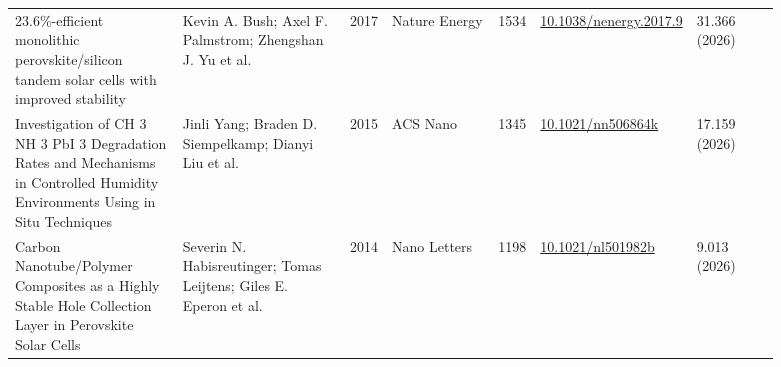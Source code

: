 \documentclass[10pt,a4paper]{article}
\begin{document}
{\begin{longtable}{p{0.220\linewidth}p{0.220\linewidth}p{0.044\linewidth}p{0.148\linewidth}p{0.044\linewidth}p{0.107\linewidth}p{0.110\linewidth}}
23.6\%-efficient monolithic perovskite/silicon tandem solar cells with improved stability & Kevin A. Bush; Axel F. Palmstrom; Zhengshan J. Yu et al. & 2017 & Nature Energy & 1534 & \href{https://doi.org/10.1038/nenergy.2017.9}{10.1038/nenergy.2017.9} & 31.366 (2026) \\
Investigation of CH 3 NH 3 PbI 3 Degradation Rates and Mechanisms in Controlled Humidity Environments Using in Situ Techniques & Jinli Yang; Braden D. Siempelkamp; Dianyi Liu et al. & 2015 & ACS Nano & 1345 & \href{https://doi.org/10.1021/nn506864k}{10.1021/nn506864k} & 17.159 (2026) \\
Carbon Nanotube/Polymer Composites as a Highly Stable Hole Collection Layer in Perovskite Solar Cells & Severin N. Habisreutinger; Tomas Leijtens; Giles E. Eperon et al. & 2014 & Nano Letters & 1198 & \href{https://doi.org/10.1021/nl501982b}{10.1021/nl501982b} & 9.013 (2026) \\
\hline
\end{longtable}}
\end{document}

